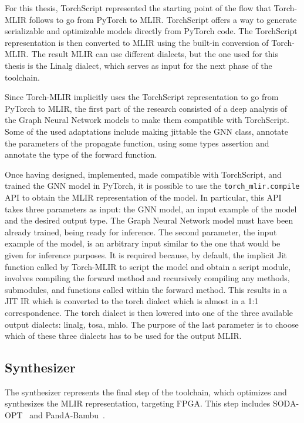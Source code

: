 \documentclass[11pt,a4paper,twocolumn]{article}
\begin{document}
For this thesis, TorchScript represented the starting point of the flow that Torch-MLIR follows to go from PyTorch to MLIR\@.
TorchScript offers a way to generate serializable and optimizable models directly from PyTorch code.
The TorchScript representation is then converted to MLIR using the built-in conversion of Torch-MLIR.
The result MLIR can use different dialects, but the one used for this thesis is the Linalg dialect, which serves as input for the next phase of the toolchain.

Since Torch-MLIR implicitly uses the TorchScript representation to go from PyTorch to MLIR, the first part of the research consisted of a deep analysis of the Graph Neural Network models to make them compatible with TorchScript.
Some of the used adaptations include making jittable the GNN class, annotate the parameters of the propagate function, using some types assertion and annotate the type of the forward function.

Once having designed, implemented, made compatible with TorchScript, and trained the GNN model in PyTorch, it is possible to use the \lstinline{torch_mlir.compile} API to obtain the MLIR representation of the model.
In particular, this API takes three parameters as input: the GNN model, an input example of the model and the desired output type.
The Graph Neural Network model must have been already trained, being ready for inference.
The second parameter, the input example of the model, is an arbitrary input similar to the one that would be given for inference purposes.
It is required because, by default, the implicit Jit function called by Torch-MLIR to script the model and obtain a script module, involves compiling the forward method and recursively compiling any methods, submodules, and functions called within the forward method. This results in a JIT IR which is converted to the torch dialect which is almost in a 1:1 correspondence.
The torch dialect is then lowered into one of the three available output dialects: linalg, tosa, mhlo.
The purpose of the last parameter is to choose which of these three dialects has to be used for the output MLIR\@.

\subsection{Synthesizer}
\label{subsec:synthesizer-toolchain}%

The synthesizer represents the final step of the toolchain, which optimizes and synthesizes the MLIR representation, targeting FPGA\@.
This step includes SODA-OPT~\cite{9786533} and PandA-Bambu~\cite{9586110}.
\end{document}
